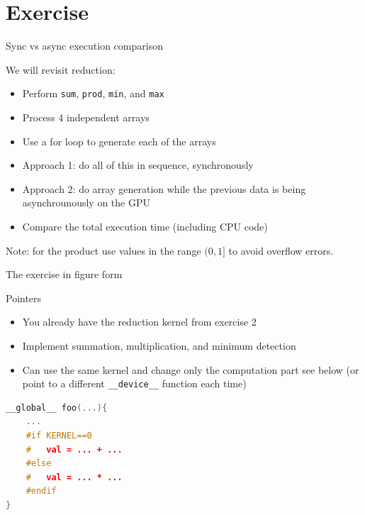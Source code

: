 \documentclass[11pt,t]{beamer}
\newcommand{\inline}[1]{ \colorbox{mygray}{\lstinline{#1}}}
\begin{document}
\section{Exercise}

\begin{frame}{Sync vs async execution comparison}

We will revisit reduction:
\vspace{0.25em}
\begin{itemize}\setlength\itemsep{0.5em}
    \item Perform \inline{sum}, \inline{prod}, \inline{min}, and \inline{max}
    \item Process 4 independent arrays
    \item Use a for loop to generate each of the arrays
    \item Approach 1: do all of this in sequence, synchronously
    \item Approach 2: do array generation while the previous data is being asynchrounously on the GPU
    \item Compare the total execution time (including CPU code)
\end{itemize}
Note: for the product use values in the range $(0, 1]$ to avoid overflow errors.
\end{frame}


\begin{frame}{The exercise in figure form}

\begin{figure}
    \centering
    
\end{figure}

\end{frame}


\begin{frame}[fragile]{Pointers}

\begin{itemize}\setlength\itemsep{0.75em}
    \item You already have the reduction kernel from exercise 2
    \item Implement summation, multiplication, and minimum detection
    \item Can use the same kernel and change only the computation part see below (or point to a different \inline{__device__} function each time)
\end{itemize}
\vspace{0.5em}

\begin{lstlisting}[language=C++]
__global__ foo(...){
    ...
    #if KERNEL==0
    #   val = ... + ...
    #else
    #   val = ... * ...
    #endif
}
\end{lstlisting}

\end{frame}
\end{document}
